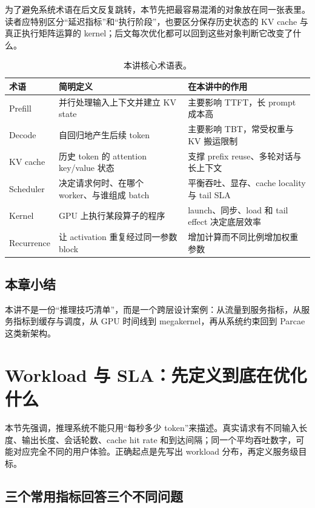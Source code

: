 \documentclass[a4paper]{article}
\begin{document}
为了避免系统术语在后文反复跳转，本节先把最容易混淆的对象放在同一张表里。读者应特别区分“延迟指标”和“执行阶段”，也要区分保存历史状态的 KV cache 与真正执行矩阵运算的 kernel；后文每次优化都可以回到这些对象判断它改变了什么。

\begin{table}[H]
\centering
\begin{tabular}{L{0.19\textwidth}L{0.29\textwidth}L{0.42\textwidth}}
\toprule
术语 & 简明定义 & 在本讲中的作用 \\
\midrule
Prefill & 并行处理输入上下文并建立 KV state & 主要影响 TTFT，长 prompt 成本高 \\
Decode & 自回归地产生后续 token & 主要影响 TBT，常受权重与 KV 搬运限制 \\
KV cache & 历史 token 的 attention key/value 状态 & 支撑 prefix reuse、多轮对话与长上下文 \\
Scheduler & 决定请求何时、在哪个 worker、与谁组成 batch & 平衡吞吐、显存、cache locality 与 tail SLA \\
Kernel & GPU 上执行某段算子的程序 & launch、同步、load 和 tail effect 决定底层效率 \\
Recurrence & 让 activation 重复经过同一参数 block & 增加计算而不同比例增加权重参数 \\
\bottomrule
\end{tabular}
\caption{本讲核心术语表。}
\end{table}

\subsection{本章小结}

本讲不是一份“推理技巧清单”，而是一个跨层设计案例：从流量到服务指标，从服务指标到缓存与调度，从 GPU 时间线到 megakernel，再从系统约束回到 Parcae 这类新架构。

\section{Workload 与 SLA：先定义到底在优化什么}

本节先强调，推理系统不能只用“每秒多少 token”来描述。真实请求有不同输入长度、输出长度、会话轮数、cache hit rate 和到达间隔；同一个平均吞吐数字，可能对应完全不同的用户体验。正确起点是先写出 workload 分布，再定义服务级目标。

\subsection{三个常用指标回答三个不同问题}
\end{document}
